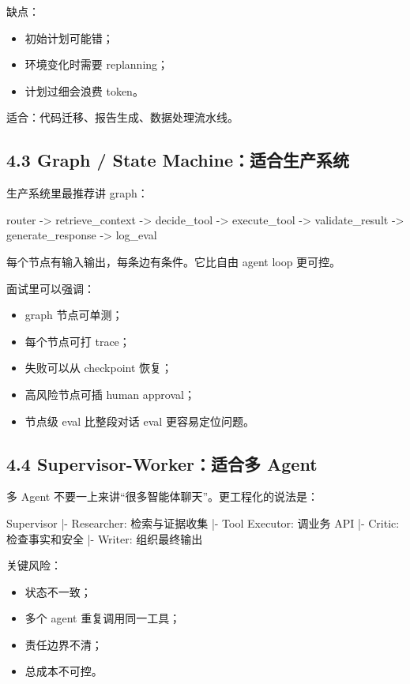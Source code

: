 缺点：


\begin{itemize}[leftmargin=2em]
\item 初始计划可能错；
\item 环境变化时需要 replanning；
\item 计划过细会浪费 token。
\end{itemize}

适合：代码迁移、报告生成、数据处理流水线。


\subsection{4.3 Graph / State Machine：适合生产系统}

生产系统里最推荐讲 graph：


\begin{codeblock}
router
  -> retrieve_context
  -> decide_tool
  -> execute_tool
  -> validate_result
  -> generate_response
  -> log_eval
\end{codeblock}

每个节点有输入输出，每条边有条件。它比自由 agent loop 更可控。


面试里可以强调：


\begin{itemize}[leftmargin=2em]
\item graph 节点可单测；
\item 每个节点可打 trace；
\item 失败可以从 checkpoint 恢复；
\item 高风险节点可插 human approval；
\item 节点级 eval 比整段对话 eval 更容易定位问题。
\end{itemize}

\subsection{4.4 Supervisor-Worker：适合多 Agent}

多 Agent 不要一上来讲``很多智能体聊天''。更工程化的说法是：


\begin{codeblock}
Supervisor
  |- Researcher: 检索与证据收集
  |- Tool Executor: 调业务 API
  |- Critic: 检查事实和安全
  |- Writer: 组织最终输出
\end{codeblock}

关键风险：


\begin{itemize}[leftmargin=2em]
\item 状态不一致；
\item 多个 agent 重复调用同一工具；
\item 责任边界不清；
\item 总成本不可控。
\end{itemize}

